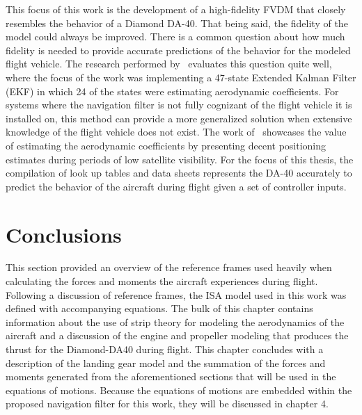 This focus of this work is the development of a high-fidelity FVDM that closely resembles the behavior of a Diamond DA-40. That being said, the fidelity of the model could always be improved. There is a common question about how much fidelity is needed to provide accurate predictions of the behavior for the modeled flight vehicle. The research performed by~\cite{khaghaniAutonomousVehicleDynamic2016} evaluates this question quite well, where the focus of the work was implementing a 47-state Extended Kalman Filter (EKF) in which 24 of the states were estimating aerodynamic coefficients. For systems where the navigation filter is not fully cognizant of the flight vehicle it is installed on, this method can provide a more generalized solution when extensive knowledge of the flight vehicle does not exist. The work of~\cite{mwenegohaModelbasedTightlyCoupled2020} showcases the value of estimating the aerodynamic coefficients by presenting decent positioning estimates during periods of low satellite visibility. For the focus of this thesis, the compilation of look up tables and data sheets represents the DA-40 accurately to predict the behavior of the aircraft during flight given a set of controller inputs.


\section{\textbf{Conclusions}}

This section provided an overview of the reference frames used heavily when calculating the forces and moments the aircraft experiences during flight. Following a discussion of reference frames, the ISA model used in this work was defined with accompanying equations. The bulk of this chapter contains information about the use of strip theory for modeling the aerodynamics of the aircraft and a discussion of the engine and propeller modeling that produces the thrust for the Diamond-DA40 during flight. This chapter concludes with a description of the landing gear model and the summation of the forces and moments generated from the aforementioned sections that will be used in the equations of motions. Because the equations of motions are embedded within the proposed navigation filter for this work, they will be discussed in chapter 4.
\clearpage